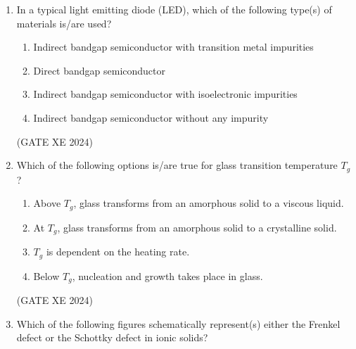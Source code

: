 \documentclass[12pt]{article}
\begin{document}
\begin{enumerate}
(GATE XE 2024)

\item In a typical light emitting diode (LED), which of the following type(s) of materials is/are used?

\begin{enumerate}
\item Indirect bandgap semiconductor with transition metal impurities
\item Direct bandgap semiconductor
\item Indirect bandgap semiconductor with isoelectronic impurities
\item Indirect bandgap semiconductor without any impurity
\end{enumerate}

(GATE XE 2024)

\item Which of the following options is/are true for glass transition temperature $T_g$?

\begin{enumerate}
\item Above $T_g$, glass transforms from an amorphous solid to a viscous liquid.
\item At $T_g$, glass transforms from an amorphous solid to a crystalline solid.
\item $T_g$ is dependent on the heating rate.
\item Below $T_g$, nucleation and growth takes place in glass.
\end{enumerate}

(GATE XE 2024)

\item Which of the following figures schematically represent(s) either the Frenkel defect or the Schottky defect in ionic solids?


\end{enumerate}
\end{document}
